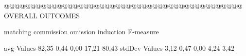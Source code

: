@@@@@@@@@@@@@@@@@@@@@@@@@@@@@@@@@@@@@@@@@@@@@ OVERALL OUTCOMES

               matching commission   omission  induction  F-measure
               
avg Values      82,35       0,44       0,00      17,21     80,43        
stdDev Values    3,12       0,47       0,00       4,24      3,42        